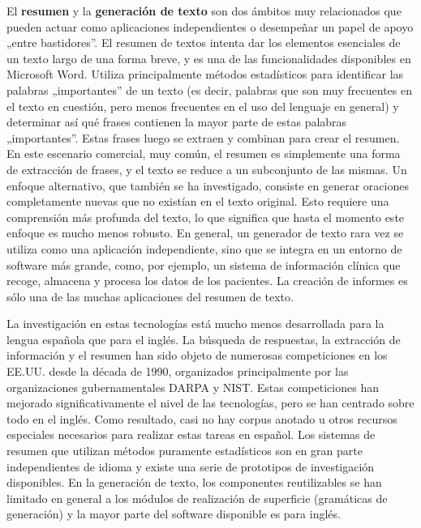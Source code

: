 \begin{multicols}{2}

El \textbf{resumen} y la \textbf{generación de texto} son dos ámbitos muy relacionados que pueden actuar como aplicaciones independientes o desempeñar un papel de apoyo „entre bastidores”. El resumen de textos intenta dar los elementos esenciales de un texto largo de una forma breve, y es una de las funcionalidades disponibles en Microsoft Word. Utiliza principalmente métodos estadísticos para identificar las palabras „importantes” de un texto (es decir, palabras que son muy frecuentes en el texto en cuestión, pero menos frecuentes en el uso del lenguaje en general) y determinar así qué frases contienen la mayor parte de estas palabras „importantes”. Estas frases luego se extraen y combinan para crear el resumen. En este escenario comercial, muy común, el resumen es simplemente una forma de extracción de frases, y el texto se reduce a un subconjunto de las mismas. Un enfoque alternativo, que también se ha investigado, consiste en generar oraciones completamente nuevas  que no existían en el texto original. Esto requiere una comprensión más profunda del texto, lo que significa que hasta el momento este enfoque es mucho menos robusto. En general, un generador de texto rara vez se utiliza como una aplicación independiente, sino que se integra en un entorno de software más grande, como, por ejemplo, un sistema de información clínica que recoge, almacena y procesa los datos de los pacientes. La creación de informes es sólo una de las muchas aplicaciones del resumen de texto.

La investigación en estas tecnologías está mucho menos desarrollada para la lengua española que para el inglés. La búsqueda de respuestas, la extracción de información y el resumen han sido objeto de numerosas competiciones en los EE.UU. desde la década de 1990, organizados principalmente por las organizaciones gubernamentales DARPA y NIST. Estas competiciones han mejorado significativamente el nivel de las tecnologías, pero se han centrado sobre todo en el inglés. Como resultado, casi no hay corpus anotado u otros recursos especiales necesarios para realizar estas tareas en español. Los sistemas de resumen que utilizan métodos puramente estadísticos son en gran parte independientes de idioma y existe una serie de prototipos de investigación disponibles. En la generación de texto, los componentes reutilizables se han limitado en general a los módulos de realización de superficie (gramáticas de generación) y la mayor parte del software disponible es para inglés.


\end{multicols}
